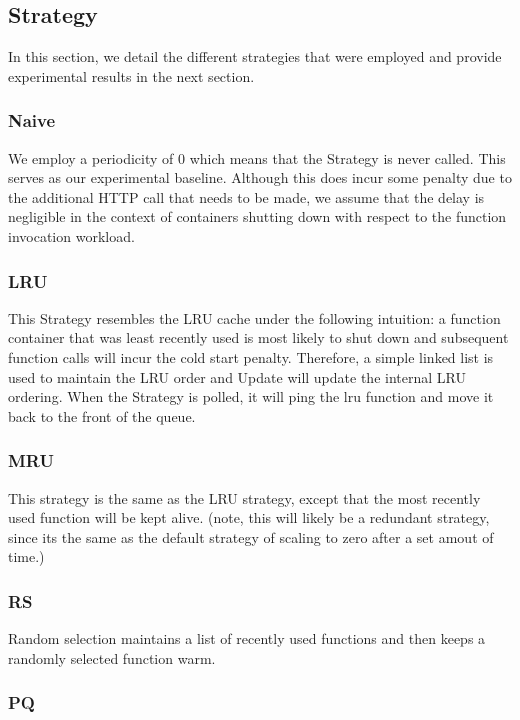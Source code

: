 \documentclass{article}
\begin{document}
\subsection{Strategy}\label{Strategy}

In this section, we detail the different strategies that were employed and provide experimental results in the next section.

\subsubsection{Naive}

We employ a periodicity of 0 which means that the Strategy is never called. This serves as our experimental baseline. Although this does incur some penalty due to the additional HTTP call that needs to be made, we assume that the delay is negligible in the context of containers shutting down with respect to the function invocation workload.

\subsubsection{LRU}

This Strategy resembles the LRU cache under the following intuition: a function container that was least recently used is most likely to shut down and subsequent function calls will incur the cold start penalty. Therefore, a simple linked list is used to maintain the LRU order and Update will update the internal LRU ordering. When the Strategy is polled, it will ping the lru function and move it back to the front of the queue.

\subsubsection{MRU}

This strategy is the same as the LRU strategy, except that the most recently used function will be kept alive. (note, this will likely be a redundant strategy, since its the same as the default strategy of scaling to zero after a set amout of time.)

\subsubsection{RS}

Random selection maintains a list of recently used functions and then keeps a randomly selected function warm.

\subsubsection{PQ}
\end{document}
